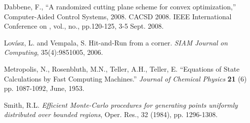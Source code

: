 \documentclass[11pt]{article}
\begin{document}
\begin{thebibliography}{99}

 Dabbene, F., ``A randomized cutting plane scheme for convex optimization,'' Computer-Aided Control Systems, 2008. CACSD 2008. IEEE International Conference on , vol., no., pp.120-125, 3-5 Sept. 2008.

 Lov\'asz, L. and Vempala, S. Hit-and-Run from a corner. \emph{SIAM Journal on Computing}, 35(4):9851005, 2006.

 Metropolis, N., Rosenbluth, M.N., Teller, A.H., Teller, E. ``Equations of State Calculations by Fast Computing Machines.'' \emph{Journal of Chemical Physics} \textbf{21} (6) pp. 1087-1092, June, 1953.

 Smith, R.L. \emph{Efficient Monte-Carlo procedures for generating points uniformly distributed over
bounded regions}, Oper. Res., 32 (1984), pp. 1296-1308.

\end{thebibliography}
\end{document}
